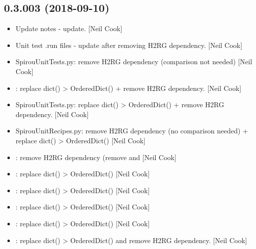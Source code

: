 \documentclass[a4paper,10pt,english]{report}
\begin{document}
\subsection{0.3.003 (2018-09-10)}
\label{\detokenize{misc/changelog:id332}}\begin{itemize}
\item {} 
Update notes - update. {[}Neil Cook{]}

\item {} 
Unit test .run files - update after removing H2RG dependency. {[}Neil
Cook{]}

\item {} 
SpirouUnitTests.py: remove H2RG dependency (comparison not needed)
{[}Neil Cook{]}

\item {} 
: replace dict() \textendash{}\textgreater{} OrderedDict() + remove H2RG
dependency. {[}Neil Cook{]}

\item {} 
SpirouUnitTests.py: replace dict() \textendash{}\textgreater{} OrderedDict() + remove H2RG
dependency. {[}Neil Cook{]}

\item {} 
SpirouUnitRecipes.py: remove H2RG dependency (no comparison needed) +
replace dict() \textendash{}\textgreater{} OrderedDict() {[}Neil Cook{]}

\item {} 
: remove H2RG dependency (remove 
and  {[}Neil Cook{]}

\item {} 
: replace dict() \textendash{}\textgreater{} OrderedDict() {[}Neil Cook{]}

\item {} 
: replace dict() \textendash{}\textgreater{} OrderedDict() {[}Neil Cook{]}

\item {} 
: replace dict() \textendash{}\textgreater{} OrderedDict() {[}Neil Cook{]}

\item {} 
: replace dict() \textendash{}\textgreater{} OrderedDict() {[}Neil Cook{]}

\item {} 
: replace dict() \textendash{}\textgreater{} OrderedDict() and remove H2RG
dependency. {[}Neil Cook{]}


\end{itemize}
\end{document}
